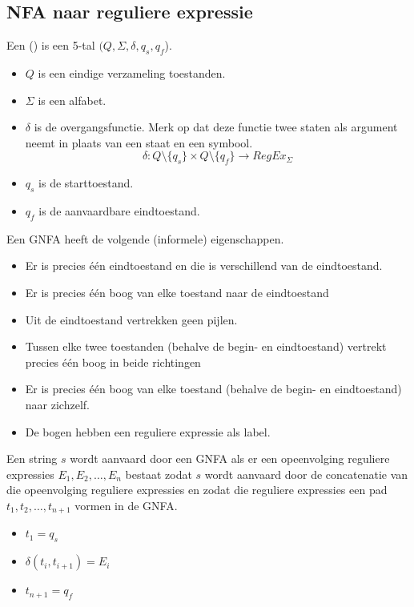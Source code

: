 \documentclass[main.tex]{subfiles}
\begin{document}
\subsection{NFA naar reguliere expressie}
\begin{de}
  Een  () is een 5-tal $(Q,\Sigma,\delta,q_{s},q_{f}$).
  \begin{itemize}
  \item $Q$ is een eindige verzameling toestanden.
  \item $\Sigma$ is een alfabet.
  \item $\delta$ is de overgangsfunctie.
  Merk op dat deze functie twee staten als argument neemt in plaats van een staat en een symbool.
    \[
    \delta: Q\setminus\{q_{s}\} \times Q\setminus\{q_{f}\} \rightarrow RegEx_{\Sigma}
    \]
  \item $q_{s}$ is de starttoestand.
  \item $q_{f}$ is de aanvaardbare eindtoestand.
  \end{itemize}
\end{de}
\begin{opm}
  Een GNFA heeft de volgende (informele) eigenschappen.
  \begin{itemize}
  \item Er is precies \'e\'en eindtoestand en die is verschillend van de eindtoestand.
  \item Er is precies \'e\'en boog van elke toestand naar de eindtoestand
  \item Uit de eindtoestand vertrekken geen pijlen.
  \item Tussen elke twee toestanden (behalve de begin- en eindtoestand) vertrekt precies \'e\'en boog in beide richtingen
  \item Er is precies \'e\'en boog van elke toestand (behalve de begin- en eindtoestand) naar zichzelf.
  \item De bogen hebben een reguliere expressie als label.
  \end{itemize}
\end{opm} 

\begin{de}
  Een string $s$ wordt aanvaard door een GNFA als er een opeenvolging reguliere expressies $E_{1},E_{2},\dotsc,E_{n}$ bestaat zodat $s$ wordt aanvaard door de concatenatie van die opeenvolging reguliere expressies en zodat die reguliere expressies een pad $t_{1},t_{2},\dotsc,t_{n+1}$ vormen in de GNFA. 
  \begin{itemize}
  \item $t_{1} = q_{s}$
  \item $\delta(t_{i},t_{i+1}) = E_{i}$
  \item $t_{n+1} = q_{f}$
  \end{itemize}
\end{de}
\end{document}
